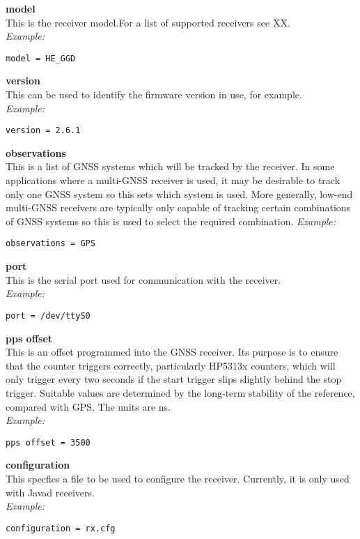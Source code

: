{\bfseries model}\\
This is the receiver model.For a list of supported receivers
see XX.\\
\textit{Example:}
\begin{lstlisting}
model = HE_GGD
\end{lstlisting}

{\bfseries version}\\
This can be used to identify the firmware version in use, for example.\\
\textit{Example:}
\begin{lstlisting}
version = 2.6.1
\end{lstlisting}

{\bfseries observations}\\
This is a list of GNSS systems which will be tracked by the receiver. 
In some applications where a multi-GNSS receiver is used, it may be desirable to track
only one GNSS system so this sets which system is used.
More generally, low-end multi-GNSS receivers are typically only capable of tracking
certain combinations of GNSS systems so this is used to select the required combination.
\textit{Example:}
\begin{lstlisting}
observations = GPS
\end{lstlisting}

{\bfseries port}\\
This is the serial port used for communication with the receiver.\\
\textit{Example:}
\begin{lstlisting}
port = /dev/ttyS0
\end{lstlisting}

{\bfseries pps offset}\\ 
This is an offset programmed into the GNSS receiver. Its purpose is to ensure that the counter
triggers correctly, particularly HP5313x counters, which will only trigger every two seconds if the 
start trigger slips slightly behind the stop trigger. Suitable values are determined by the long-term stability of the
reference, compared with GPS.
The units are ns.\\
\textit{Example:}
\begin{lstlisting}
pps offset = 3500
\end{lstlisting}

{\bfseries configuration}\\ \hypertarget{h:configuration}{}
This specfies a file to be used to configure the receiver. Currently, it is only used
with Javad receivers.\\
\textit{Example:}
\begin{lstlisting}
configuration = rx.cfg
\end{lstlisting}

